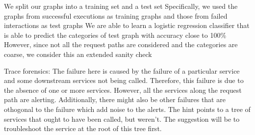 We split our graphs into a training set and a test set
Specifically, we used the graphs from successful executions as training graphs and those from failed interactions as test graphs
We are able to learn a logistic regression classifier that is able to predict the categories of test graph with accuracy close to 100\%
However, since not all the request paths are considered and the categories are coarse, we consider this an extended sanity check

Trace forensics: \newline
The failure here is caused by the failure of a particular service and some downstream services not being called. 
Therefore, this failure is due to the absence of one or more services.
However, all the services along the request path are alerting.
Additionally, there might also be other failures that are othogonal to the failure which add noise to the alerts.
The hint points to a tree of services that ought to have been called, but weren’t. The suggestion will be to troubleshoot the service at the root of this tree first.
